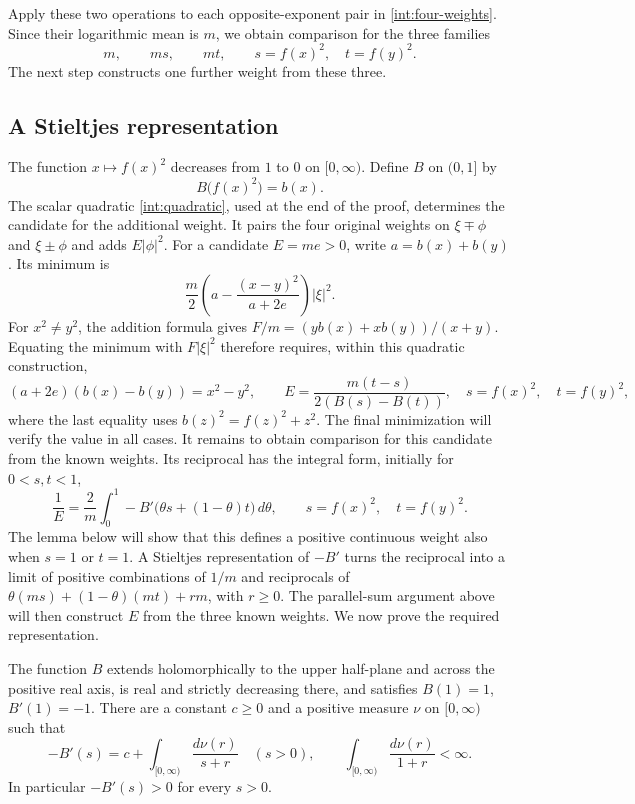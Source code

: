 Apply these two operations to each opposite-exponent pair in
\eqref{int:four-weights}.  Since their logarithmic mean is $m$, we obtain
comparison for the three families
\begin{equation}\label{int:basic-weights}
 m,\qquad ms,\qquad mt,
 \qquad s=f(x)^2,\quad t=f(y)^2.
\end{equation}
The next step constructs one further weight from these three.

\subsection{A Stieltjes representation}

The function $x\mapsto f(x)^2$ decreases from $1$ to $0$ on $[0,\infty)$.
Define $B$ on $(0,1]$ by
\begin{equation}\label{int:B-definition}
 B\bigl(f(x)^2\bigr)=b(x).
\end{equation}
The scalar quadratic \eqref{int:quadratic}, used at the end of the proof,
determines the candidate for the additional weight. It pairs the
four original weights on $\xi\mp\phi$ and $\xi\pm\phi$ and adds
$E|\phi|^2$. For a candidate $E=me>0$, write $a=b(x)+b(y)$. Its minimum is
\[
 \frac m2\left(a-\frac{(x-y)^2}{a+2e}\right)|\xi|^2.
\]
For $x^2\ne y^2$, the addition formula gives
$F/m=(yb(x)+xb(y))/(x+y)$. Equating the minimum with $F|\xi|^2$ therefore
requires, within this quadratic construction,
\[
 (a+2e)(b(x)-b(y))=x^2-y^2,
 \qquad
 E=\frac{m(t-s)}{2(B(s)-B(t))},
 \quad s=f(x)^2,\quad t=f(y)^2,
\]
where the last equality uses $b(z)^2=f(z)^2+z^2$. The final minimization
will verify the value in all cases. It remains to obtain comparison for
this candidate from the known weights. Its reciprocal has the integral
form, initially for $0<s,t<1$,
\begin{equation}\label{int:E-integral}
 \frac1E=\frac2m\int_0^1
       -B'\bigl(\theta s+(1-\theta)t\bigr)\,d\theta,
 \qquad s=f(x)^2,\quad t=f(y)^2.
\end{equation}
The lemma below will show that this defines a positive continuous weight
also when $s=1$ or $t=1$. A Stieltjes representation of $-B'$ turns
the reciprocal into a limit of positive combinations of $1/m$ and
reciprocals of
$\theta(ms)+(1-\theta)(mt)+rm$, with $r\ge0$.
The parallel-sum argument above will then construct $E$ from the three
known weights. We now prove the required representation.

\begin{lemma}\label{int:stieltjes}
The function $B$ extends holomorphically to the upper half-plane and
across the positive real axis, is real and strictly decreasing there,
and satisfies $B(1)=1$, $B'(1)=-1$.  There are a constant $c\ge0$ and a
positive measure $\nu$ on $[0,\infty)$ such that
\begin{equation}\label{int:stieltjes-form}
 -B'(s)=c+\int_{[0,\infty)}\frac{d\nu(r)}{s+r}
 \quad(s>0),\qquad
 \int_{[0,\infty)}\frac{d\nu(r)}{1+r}<\infty.
\end{equation}
In particular $-B'(s)>0$ for every $s>0$.
\end{lemma}

